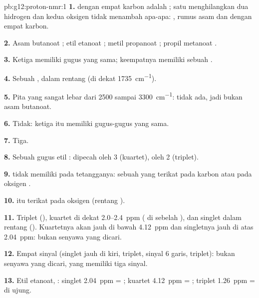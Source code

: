 \begin{solution}{pb:g12:proton-nmr:1}
\textbf{1.}  dengan empat karbon adalah ; satu 
menghilangkan dua hidrogen dan kedua oksigen tidak menambah apa-apa:
, rumus asam dan  dengan empat karbon.

\textbf{2.} Asam butanoat ; etil etanoat
; metil propanoat ; propil
metanoat .

\textbf{3.} Ketiga  memiliki gugus  yang sama; keempatnya
memiliki sebuah .

\textbf{4.} Sebuah , dalam rentang  (di dekat
\qty{1735}{cm^{-1}}).

\textbf{5.} Pita  yang sangat lebar dari 2500 sampai
\qty{3300}{cm^{-1}}: tidak ada, jadi bukan asam butanoat.

\textbf{6.} Tidak: ketiga  itu memiliki gugus-gugus yang sama.

\textbf{7.} Tiga.

\textbf{8.} Sebuah gugus etil :  dipecah oleh 3
 (kuartet),  oleh 2 (triplet).

\textbf{9.}  tidak memiliki  pada 
tetangganya: sebuah  yang terikat pada karbon  atau
pada oksigen .

\textbf{10.}  itu terikat pada oksigen (rentang ).

\textbf{11.} Triplet (), kuartet di dekat 2.0--\qty{2.4}{ppm}
( di sebelah ), dan singlet dalam rentang 
(). Kuartetnya akan jauh di bawah \qty{4.12}{ppm} dan
singletnya jauh di atas \qty{2.04}{ppm}: bukan senyawa yang dicari.

\textbf{12.} Empat sinyal (singlet jauh di kiri, triplet, sinyal 6
garis, triplet): bukan senyawa yang dicari, yang memiliki tiga sinyal.

\textbf{13.} Etil etanoat, : singlet
\qty{2.04}{ppm} = ; kuartet \qty{4.12}{ppm} = ;
triplet \qty{1.26}{ppm} =  di ujung.


\end{solution}
